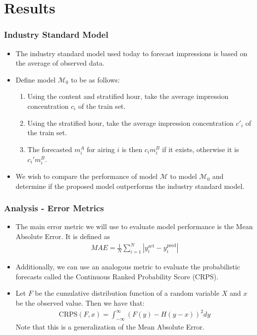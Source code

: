 \documentclass{beamer}
\begin{document}
\section{Results}

\begin{frame}
\frametitle{Industry Standard Model}

\begin{itemize}
\item The industry standard model used today to forecast impressions is based on the average of observed data.
\pause
\item Define model $\mathcal{M}_0$ to be as follows:
  \begin{enumerate}
    \item Using the content and stratified hour, take the average impression concentration $c_i$ of the train set.
    \item Using the stratified hour, take the average impression concentration $c'_i$ of the train set.
    \item The forecasted $m_i^A$ for airing $i$ is then $c_i m_i^B$ if it exists, otherwise it is $c_i' m_i^B$.
  \end{enumerate}
\pause
\item We wish to compare the performance of model $\mathcal{M}$ to model $\mathcal{M}_0$ and determine
  if the proposed model outperforms the industry standard model.
\end{itemize}
\end{frame}

\begin{frame}
\frametitle{Analysis - Error Metrics}
\begin{itemize}
  \item The main error metric we will use to evaluate model performance is the Mean Absolute Error. It is defined as
    \begin{align*}
      MAE = \frac{1}{N}\sum_{i=1}^N|y_i^{\text{act}} - y_i^{\text{pred}}|
    \end{align*}
  \pause
  \item Additionally, we can use an analogous metric to evaluate the probabilistic forecasts called
    the Continuous Ranked Probability Score (CRPS).
\pause
\item Let $F$ be the cumulative distribution function of a random variable $X$
    and $x$ be the observed value. Then we have that:
    \begin{align}\label{form:crps}
      \text{CRPS}(F, x) = \int_{-\infty}^{\infty}\left(F(y) - H(y - x)\right)^2dy
    \end{align}
    Note that this is a generalization of the Mean Absolute Error.
\end{itemize}
\end{frame}
\end{document}
